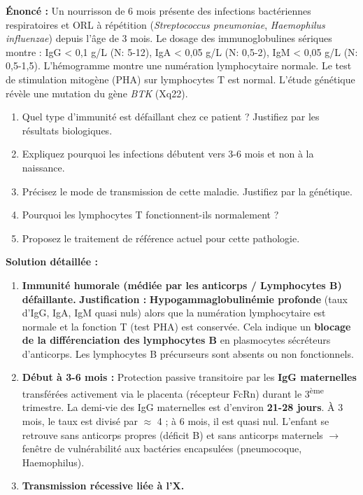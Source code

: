 \documentclass[11pt]{article}
\begin{document}
\begin{exoresolu}
\textbf{Énoncé :} Un nourrisson de 6 mois présente des infections bactériennes respiratoires et ORL à répétition (\emph{Streptococcus pneumoniae}, \emph{Haemophilus influenzae}) depuis l'âge de 3 mois. Le dosage des immunoglobulines sériques montre : IgG < 0,1 g/L (N: 5-12), IgA < 0,05 g/L (N: 0,5-2), IgM < 0,05 g/L (N: 0,5-1,5). L'hémogramme montre une numération lymphocytaire normale. Le test de stimulation mitogène (PHA) sur lymphocytes T est normal. L'étude génétique révèle une mutation du gène \textit{BTK} (Xq22).
\begin{enumerate}
 \item Quel type d'immunité est défaillant chez ce patient ? Justifiez par les résultats biologiques.
 \item Expliquez pourquoi les infections débutent vers 3-6 mois et non à la naissance.
 \item Précisez le mode de transmission de cette maladie. Justifiez par la génétique.
 \item Pourquoi les lymphocytes T fonctionnent-ils normalement ?
 \item Proposez le traitement de référence actuel pour cette pathologie.
\end{enumerate}
\tcblower
\textbf{Solution détaillée :}
\begin{enumerate}
 \item \textbf{Immunité humorale (médiée par les anticorps / Lymphocytes B) défaillante.}
 \textbf{Justification :} \textbf{Hypogammaglobulinémie profonde} (taux d'IgG, IgA, IgM quasi nuls) alors que la numération lymphocytaire est normale et la fonction T (test PHA) est conservée. Cela indique un \textbf{blocage de la différenciation des lymphocytes B} en plasmocytes sécréteurs d'anticorps. Les lymphocytes B précurseurs sont absents ou non fonctionnels.
 \item \textbf{Début à 3-6 mois :} Protection passive transitoire par les \textbf{IgG maternelles} transférées activement via le placenta (récepteur FcRn) durant le 3\textsuperscript{ème} trimestre. La demi-vie des IgG maternelles est d'environ \textbf{21-28 jours}. À 3 mois, le taux est divisé par $\approx$ 4 ; à 6 mois, il est quasi nul. L'enfant se retrouve sans anticorps propres (déficit B) et sans anticorps maternels $\rightarrow$ fenêtre de vulnérabilité aux bactéries encapsulées (pneumocoque, Haemophilus).
 \item \textbf{Transmission récessive liée à l'X.}

\end{enumerate}
\end{exoresolu}
\end{document}
